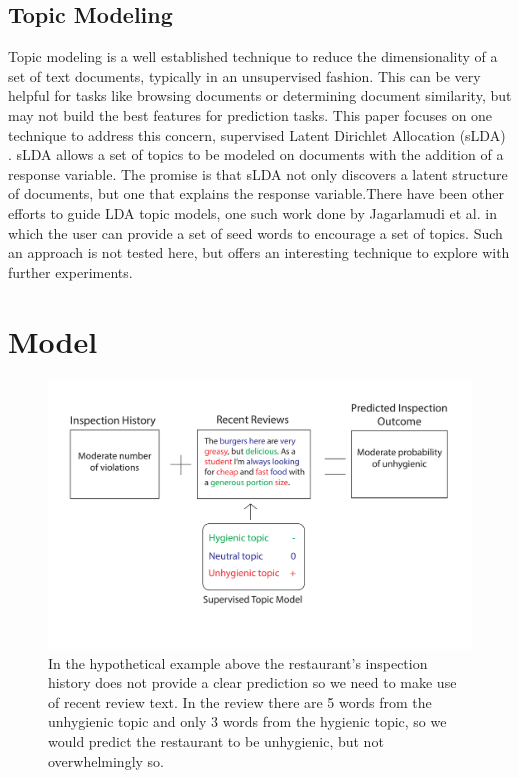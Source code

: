 \documentclass{article}
\begin{document}
\subsection{Topic Modeling}

Topic modeling is a well established \cite{blei} technique to reduce the dimensionality of a set of text documents, 
typically in an unsupervised fashion. This can be very helpful for tasks like browsing documents or determining document 
similarity, but may not build the best features for prediction tasks. This paper focuses on one technique to address this 
concern, supervised Latent Dirichlet Allocation (sLDA) \cite{mcauliffe}. sLDA allows a set of topics to be modeled on documents with the addition of a response variable. The promise is that sLDA not only discovers a latent structure of documents, but one that explains the response 
variable.There have been other efforts to guide LDA topic models, one such work done by Jagarlamudi et al. \cite{jagarlamudi} 
in which the user can provide a set of seed words to encourage a set of topics. Such an approach is not tested here, but 
offers an interesting technique to explore with further experiments.

\section{Model}

\begin{figure}[h]
\centering
\includegraphics[scale = 0.5]{figure1}
\caption{In the hypothetical example above the restaurant's inspection history does not provide a clear prediction so we need 
to make use of recent review text. In the review there are 5 words from the unhygienic topic and only 3 words from the 
hygienic topic, so we would predict the restaurant to be unhygienic, but not overwhelmingly so.}
\end{figure}
\end{document}
